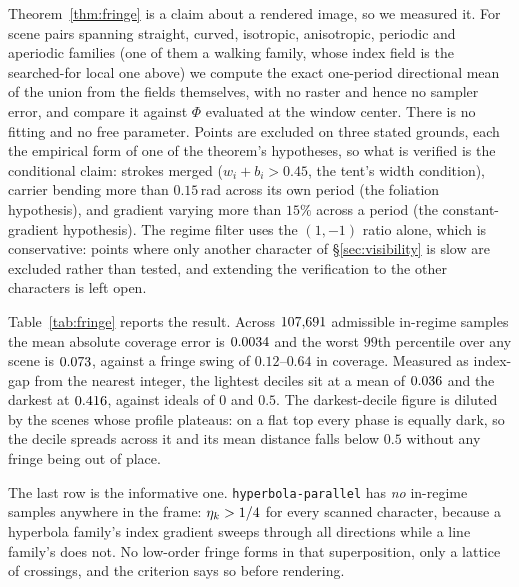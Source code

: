 Theorem~\ref{thm:fringe} is a claim about a rendered image, so we measured it.
For \fringeScenes{} scene pairs spanning straight, curved, isotropic,
anisotropic, periodic and aperiodic families (one of them a walking family,
whose index field is the searched-for local one above) we compute the exact
one-period directional mean of the union from the fields themselves, with no
raster and hence no sampler error, and
compare it against $\Phi$ evaluated at the window center. There is no fitting and no free
parameter. Points are excluded on three stated grounds, each the empirical form
of one of the theorem's hypotheses, so what is verified is the conditional
claim: strokes merged ($w_i+b_i>0.45$, the tent's width condition), carrier
bending more than $0.15$\,rad across its own period (the foliation hypothesis),
and gradient varying more than $15\%$ across a period (the constant-gradient
hypothesis). The regime filter uses the $(1,-1)$ ratio alone, which is
conservative: points where only another character of \S\ref{sec:visibility} is
slow are excluded rather than tested, and extending the verification to the
other characters is left open.



Table~\ref{tab:fringe} reports the result. Across $107{,}691$ admissible
in-regime samples the mean absolute coverage error is $0.0034$ and the
worst $99$th percentile over any scene is $0.073$, against a fringe swing of
$0.12$--$0.64$ in coverage. Measured as index-gap from the nearest integer, the
lightest deciles sit at a mean of $0.036$ and the darkest at $0.416$,
against ideals of $0$ and $0.5$. The darkest-decile figure is diluted by the
scenes whose profile plateaus: on a flat top every phase is equally dark, so the
decile spreads across it and its mean distance falls below $0.5$ without any
fringe being out of place.

The last row is the informative one. \texttt{hyperbola-parallel} has \emph{no}
in-regime samples anywhere in the frame: $\eta_k>1/4$ for every scanned
character, because a hyperbola family's index gradient sweeps through all
directions while a line family's does not. No low-order fringe forms in that
superposition, only a lattice of crossings, and the criterion says so before
rendering.
